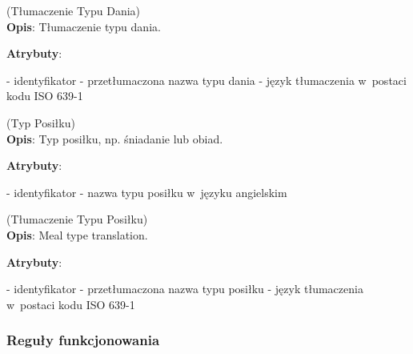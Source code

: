\begin{enumerate}[label={\textbf{KAT/3/\protect\twodigits{\theenumi}}}, wide, labelwidth=!, labelindent=0pt, labelsep=0pt, series=reqs]
    \label{kat:DishTypeTranslation} (Tłumaczenie Typu Dania)\\
    \indent\textbf{Opis}: Tłumaczenie typu dania.
    \par
    \textbf{Atrybuty}:
    \begin{itemize}[series=atr, wide, align=left, leftmargin=190pt]
        \label{kat:DishTypeTranslation:id}- identyfikator
        \label{kat:DishTypeTranslation:translation}- przetłumaczona nazwa typu dania
        \label{kat:DishTypeTranslation:language}- język tłumaczenia w~postaci kodu ISO 639-1
    \end{itemize}

    \label{kat:MealType} (Typ Posiłku)\\
    \indent\textbf{Opis}: Typ posiłku, np. śniadanie lub obiad.
    \par
    \textbf{Atrybuty}:
    \begin{itemize}[series=atr, wide, align=left, leftmargin=190pt]
        \label{kat:MealType:id}- identyfikator
        \label{kat:MealType:name}- nazwa typu posiłku w~języku angielskim
    \end{itemize}

    \label{kat:MealTypeTranslation} (Tłumaczenie Typu Posiłku)\\
    \indent\textbf{Opis}: Meal type translation.
    \par
    \textbf{Atrybuty}:
    \begin{itemize}[series=atr, wide, align=left, leftmargin=190pt]
        \label{kat:MealTypeTranslation:id}- identyfikator
        \label{kat:MealTypeTranslation:translation}- przetłumaczona nazwa typu posiłku
        \label{kat:MealTypeTranslation:language}- język tłumaczenia w~postaci kodu ISO 639-1
    \end{itemize}

\end{enumerate}

\subsubsection{Reguły funkcjonowania}\label{subsubsec:database:recipes:functionalRules}

